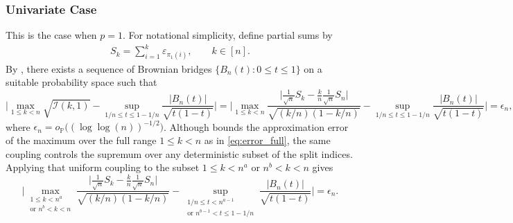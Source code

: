 \documentclass[10pt]{article}
\def\I{\mathscr{I}}
\theoremstyle{definition}
\theoremstyle{remark}
\begin{document}
\subsubsection*{Univariate Case} \label{sec:thm-master-uni}

This is the case when $p = 1$. For notational simplicity, define partial sums by
\begin{align*}
    S_k = \sum_{i = 1}^k \varepsilon_{\pi_1(i)}, \qquad k \in [n].
\end{align*}
By \citet[Equation A.4.37]{csorgo1997limit}, there exists a sequence of Brownian bridges $ \{ B_n(t) : 0 \leq t \leq 1 \} $ on a suitable probability space such that
\begin{equation} \label{eq:error_full}
\bigg|\max_{1 \leq k < n}  \sqrt{\I(k,1)} - \sup_{1/n \leq t \leq 1-1/n}\frac{|B_n(t)|}{\sqrt{t(1-t)}} \bigg| = 
\bigg|\max_{1 \leq k < n} \frac{\Big|\frac{1}{\sqrt{n}}S_k - \frac{k}{n}\frac{1}{\sqrt{n}}S_n \Big|}{\sqrt{(k/n)(1-k/n)}} - \sup_{1/n \leq t \leq 1-1/n}\frac{|B_n(t)|}{\sqrt{t(1-t)}} \bigg| = \epsilon_n,
\end{equation}
where $ \epsilon_n = o_{\mathbb{P}}\big((\log\log(n))^{-1/2}\big) $.
Although \citet[Equation A.4.37]{csorgo1997limit} bounds the approximation error of the maximum over the full range $ 1 \leq k < n $ as in \eqref{eq:error_full}, the same coupling controls the supremum over any deterministic subset of the split indices. Applying that uniform coupling to the subset $1 \leq k < n^{a}$ or $n^{b} < k < n$ gives
\begin{equation*}
\bigg|\max_{\substack{1 \leq k < n^{a}\\ \text{or } n^{b} < k < n}} \frac{\Big|\frac{1}{\sqrt{n}}S_k - \frac{k}{n}\frac{1}{\sqrt{n}}S_n \Big|}{\sqrt{(k/n)(1-k/n)}}- \sup_{\substack{1/n \leq t < n^{a-1}\\ \text{or } n^{b-1} < t \leq 1-1/n}}\frac{|B_n(t)|}{\sqrt{t(1-t)}} \bigg|  = \epsilon_n.
\end{equation*}
\end{document}
